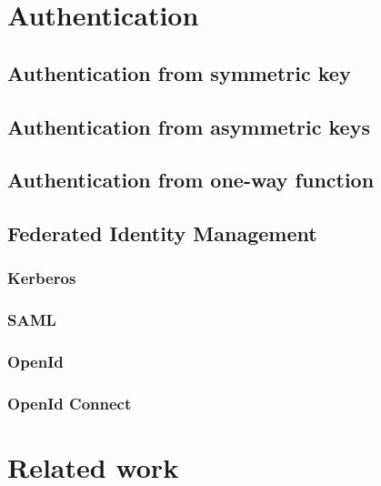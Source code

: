  



\section{Authentication}
\subsection{Authentication from symmetric key}
\subsection{Authentication from asymmetric keys}
\subsection{Authentication from one-way function}
\subsection{Federated Identity Management}
\subsubsection{Kerberos}
\subsubsection{SAML}
\subsubsection{OpenId}
\subsubsection{OpenId Connect}

\section{Related work}